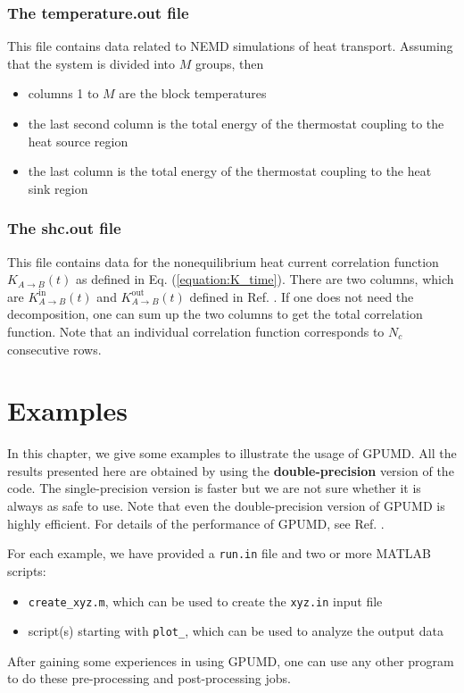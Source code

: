 \documentclass[12pt,a4paper]{report}
\begin{document}
\subsection{The temperature.out file}

This file contains data related to NEMD simulations of heat transport. Assuming that the system is divided into $M$ groups, then
\begin{itemize}
\item columns 1 to $M$ are the block temperatures
\item the last second column is the total energy of the thermostat coupling to the heat source region
\item the last column is the total energy of the thermostat coupling to the heat sink region
\end{itemize}


\subsection{The shc.out file}

This file contains data for the nonequilibrium heat current correlation function $K_{A \rightarrow B}(t)$ as defined in Eq. (\ref{equation:K_time}). There are two columns, which are $K_{A \rightarrow B}^{\text{in}}(t)$ and $K_{A \rightarrow B}^{\text{out}}(t)$ defined in Ref. \cite{fan2017prb}. If one does not need the decomposition, one can sum up the two columns to get the total correlation function. Note that an individual correlation function corresponds to $N_c$ consecutive rows.

\chapter{Examples}

In this chapter, we give some examples to illustrate the usage of GPUMD. All the results presented here are obtained by using the \textbf{double-precision} version of the code. The single-precision version is faster but we are not sure whether it is always as safe to use.
Note that even the double-precision version of GPUMD is highly efficient. For details of the performance of GPUMD, see Ref. \cite{fan2017cpc}.

For each example, we have provided a \verb"run.in" file and two or more MATLAB scripts:
\begin{itemize}
\item \verb"create_xyz.m", which can be used to create the \verb"xyz.in" input file
\item script(s) starting with \verb"plot_", which can be used to analyze the output data
\end{itemize}
After gaining some experiences in using GPUMD, one can use any other program to do these pre-processing and post-processing jobs.
\end{document}
